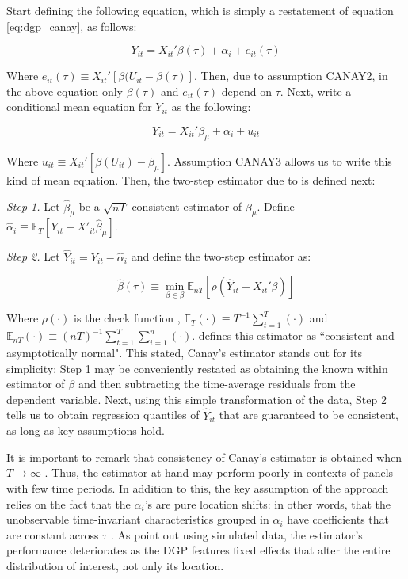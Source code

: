 \documentclass{article}
\begin{document}
Start defining the following equation, which is simply a restatement of equation \ref{eq:dgp_canay}, as follows:

\begin{equation}\label{eq:canay_2.3}
Y_{it} = X_{it}' \beta(\tau) + \alpha_i + e_{it}(\tau)
\end{equation}

Where $e_{it}(\tau) \equiv X_{it}'[\beta(U_{it} - \beta(\tau)]$. Then, due to assumption CANAY2, in the above equation only $\beta(\tau)$ and $e_{it}(\tau)$ depend on $\tau$. Next, write a conditional mean equation for $Y_{it}$ as the following:

\begin{equation}\label{eq:canay_meaneq}
    Y_{it} = X_{it}' \beta_{\mu} + \alpha_i + u_{it}
\end{equation}

Where $u_{it} \equiv X_{it}' [\beta(U_{it}) - \beta_{\mu}]$. Assumption CANAY3 allows us to write this kind of mean equation. Then, the two-step estimator due to \cite{canay2011} is defined next:

\textit{Step 1.} Let $\hat{\beta}_\mu$ be a $\sqrt{nT}$-consistent estimator of $\beta_{\mu}$. Define $\hat{\alpha}_i \equiv \mathbb{E}_T[Y_{it} - X'_{it}\hat{\beta}_{\mu}]$.

\textit{Step 2.} Let $\hat{Y}_{it} = Y_{it} - \hat{\alpha}_i$ and define the two-step estimator as:

\begin{equation}\label{eq:qreg_canay}
    \hat{\beta}(\tau) \equiv \min_{\beta \in \beta} \mathbb{E}_{nT} [\rho(\hat{Y}_{it} - X_{it}' \beta)]
\end{equation}

Where $\rho(\cdot)$ is the check function \cite{koenker1978}, $\mathbb{E}_{T}(\cdot) \equiv T^{-1} \sum_{t=1}^{T} (\cdot)$ and  $\mathbb{E}_{nT}(\cdot) \equiv (nT)^{-1} \sum_{t=1}^{T} \sum_{i=1}^n(\cdot)$. \cite{canay2011} defines this estimator as ``consistent and asymptotically normal". This stated, Canay's estimator stands out for its simplicity: Step 1 may be conveniently restated as obtaining the known within estimator of $\beta$ and then subtracting the time-average residuals from the dependent variable. Next, using this simple transformation of the data, Step 2 tells us to obtain regression quantiles of $\hat{Y}_{it}$ that are guaranteed to be consistent, as long as key assumptions hold.

It is important to remark that consistency of Canay's estimator is obtained when $T \rightarrow \infty$ \cite{canay2011}. Thus, the estimator at hand may perform poorly in contexts of panels with few time periods. In addition to this, the key assumption of the approach relies on the fact that the $\alpha_i$'s are pure location shifts: in other words, that the unobservable time-invariant characteristics grouped in $\alpha_i$ have coefficients that are constant across $\tau$ \cite{canay2011}. As \cite{mss2019} point out using simulated data, the estimator's performance deteriorates as the DGP features fixed effects that alter the entire distribution of interest, not only its location.
\end{document}
